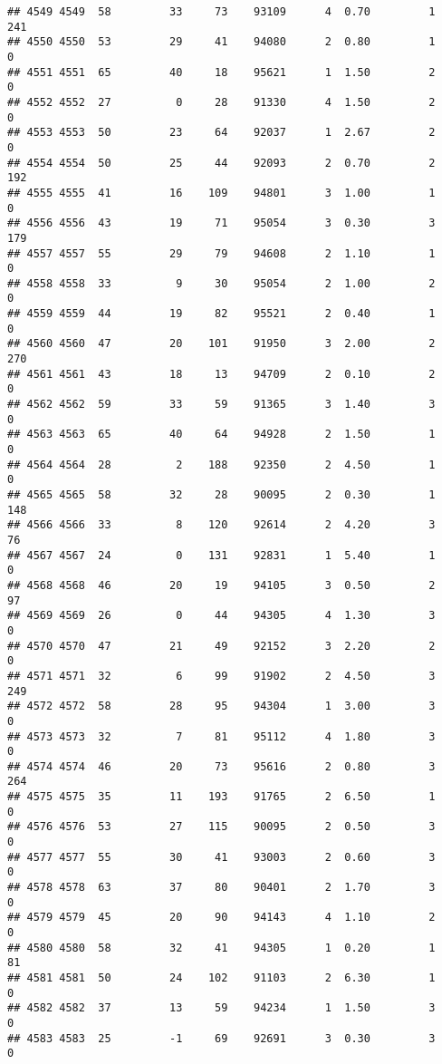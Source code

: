 \documentclass[
]{article}
\begin{document}
\begin{verbatim}
## 4549 4549  58         33     73    93109      4  0.70         1      241
## 4550 4550  53         29     41    94080      2  0.80         1        0
## 4551 4551  65         40     18    95621      1  1.50         2        0
## 4552 4552  27          0     28    91330      4  1.50         2        0
## 4553 4553  50         23     64    92037      1  2.67         2        0
## 4554 4554  50         25     44    92093      2  0.70         2      192
## 4555 4555  41         16    109    94801      3  1.00         1        0
## 4556 4556  43         19     71    95054      3  0.30         3      179
## 4557 4557  55         29     79    94608      2  1.10         1        0
## 4558 4558  33          9     30    95054      2  1.00         2        0
## 4559 4559  44         19     82    95521      2  0.40         1        0
## 4560 4560  47         20    101    91950      3  2.00         2      270
## 4561 4561  43         18     13    94709      2  0.10         2        0
## 4562 4562  59         33     59    91365      3  1.40         3        0
## 4563 4563  65         40     64    94928      2  1.50         1        0
## 4564 4564  28          2    188    92350      2  4.50         1        0
## 4565 4565  58         32     28    90095      2  0.30         1      148
## 4566 4566  33          8    120    92614      2  4.20         3       76
## 4567 4567  24          0    131    92831      1  5.40         1        0
## 4568 4568  46         20     19    94105      3  0.50         2       97
## 4569 4569  26          0     44    94305      4  1.30         3        0
## 4570 4570  47         21     49    92152      3  2.20         2        0
## 4571 4571  32          6     99    91902      2  4.50         3      249
## 4572 4572  58         28     95    94304      1  3.00         3        0
## 4573 4573  32          7     81    95112      4  1.80         3        0
## 4574 4574  46         20     73    95616      2  0.80         3      264
## 4575 4575  35         11    193    91765      2  6.50         1        0
## 4576 4576  53         27    115    90095      2  0.50         3        0
## 4577 4577  55         30     41    93003      2  0.60         3        0
## 4578 4578  63         37     80    90401      2  1.70         3        0
## 4579 4579  45         20     90    94143      4  1.10         2        0
## 4580 4580  58         32     41    94305      1  0.20         1       81
## 4581 4581  50         24    102    91103      2  6.30         1        0
## 4582 4582  37         13     59    94234      1  1.50         3        0
## 4583 4583  25         -1     69    92691      3  0.30         3        0

\end{verbatim}
\end{document}
